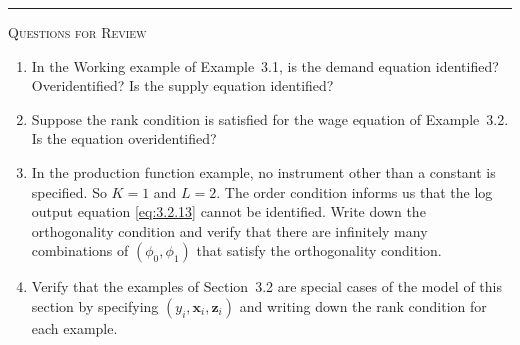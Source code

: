 \bigskip
\begin{center}\rule{0.6\textwidth}{0.4pt}\end{center}
\noindent\textsc{Questions for Review}
\medskip

\begin{enumerate}
\item In the Working example of Example~3.1, is the demand equation identified?
  Overidentified?  Is the supply equation identified?

\item Suppose the rank condition is satisfied for the wage equation of Example~3.2.
  Is the equation overidentified?

\item In the production function example, no instrument other than a constant is specified.
  So $K = 1$ and $L = 2$.  The order condition informs us that the log output
  equation \eqref{eq:3.2.13} cannot be identified.  Write down the orthogonality condition
  and verify that there are infinitely many combinations of $(\phi_0, \phi_1)$ that satisfy
  the orthogonality condition.

\item Verify that the examples of Section~3.2 are special cases of the model of this
  section by specifying $(y_i, \mathbf{x}_i, \mathbf{z}_i)$ and writing down the rank condition for each
  example.
\end{enumerate}
